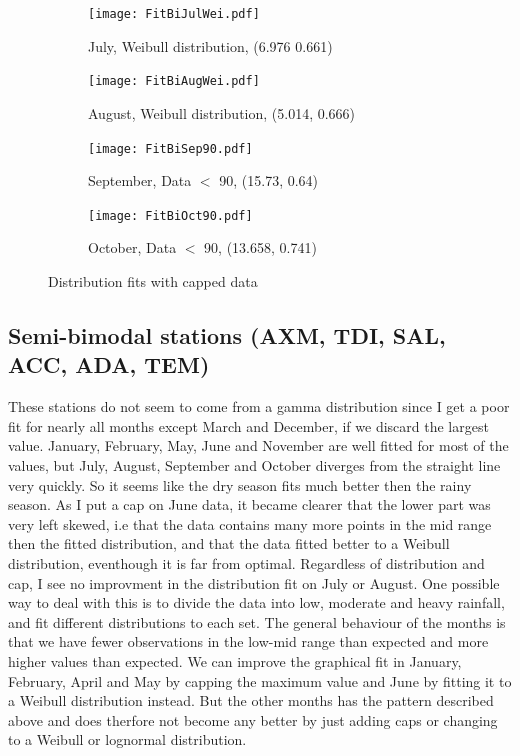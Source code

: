 \documentclass{article}
\begin{document}
	\begin{figure}[H]
		\ContinuedFloat
		\centering
		\begin{subfigure}{0.5\textwidth}
			\centering
			\texttt{[image: FitBiJulWei.pdf]}
			\caption{July, Weibull distribution, (6.976 0.661)}
			\end{subfigure}%
		\begin{subfigure}{0.5\textwidth}
			\centering
			\texttt{[image: FitBiAugWei.pdf]}
			\caption{August, Weibull distribution, (5.014, 0.666)}
		\end{subfigure}
		\begin{subfigure}{0.5\textwidth}
			\centering
			\texttt{[image: FitBiSep90.pdf]}
			\caption{September, Data $<$ 90, (15.73, 0.64)}
		\end{subfigure}%
		\begin{subfigure}{0.5\textwidth}
			\centering
			\texttt{[image: FitBiOct90.pdf]}
			\caption{October, Data $<$ 90, (13.658, 0.741)}
		\end{subfigure}
		\caption{Distribution fits with capped data}
		\end{figure}
	
	\subsection{Semi-bimodal stations (AXM, TDI, SAL, ACC, ADA, TEM)}
	These stations do not seem to come from a gamma distribution since I get a poor fit for nearly all months except March and December, if we discard the largest value. January, February, May, June and November are well fitted for most of the values, but July, August, September and October diverges from the straight line very quickly. So it seems like the dry season fits much better then the rainy season.
	As I put a cap on June data, it became clearer that the lower part was very left skewed, i.e that the data contains many more points in the mid range then the fitted distribution, and that the data fitted better to a Weibull distribution, eventhough it is far from optimal. Regardless of distribution and cap, I see no improvment in the distribution fit on July or August. One possible way to deal with this is to divide the data into low, moderate and heavy rainfall, and fit different distributions to each set. The general behaviour of the months is that we have fewer observations in the low-mid range than expected and more higher values than expected. We can improve the graphical fit in January, February, April and May by capping the maximum value and June by fitting it to a Weibull distribution instead. But the other months has the pattern described above and does therfore not become any better by just adding caps or changing to a Weibull or lognormal distribution.
	
\end{document}
